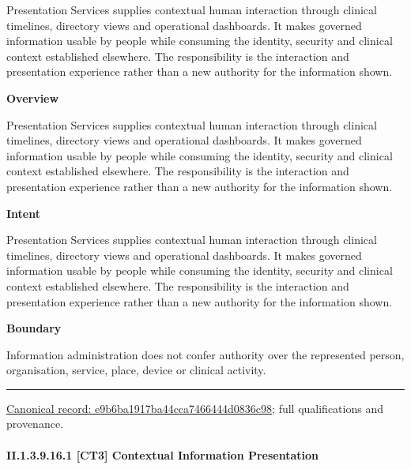 Presentation Services supplies contextual human interaction through clinical timelines, directory views and operational dashboards. It makes governed information usable by people while consuming the identity, security and clinical context established elsewhere. The responsibility is the interaction and presentation experience rather than a new authority for the information shown.



\textbf{Overview}



Presentation Services supplies contextual human interaction through clinical timelines, directory views and operational dashboards. It makes governed information usable by people while consuming the identity, security and clinical context established elsewhere. The responsibility is the interaction and presentation experience rather than a new authority for the information shown.



\textbf{Intent}



Presentation Services supplies contextual human interaction through clinical timelines, directory views and operational dashboards. It makes governed information usable by people while consuming the identity, security and clinical context established elsewhere. The responsibility is the interaction and presentation experience rather than a new authority for the information shown.



\textbf{Boundary}



Information administration does not confer authority over the represented person, organisation, service, place, device or clinical activity.



\medskip\hrule\medskip

{\footnotesize \href{../../../../../../../continuum/strategy/capability/e9b6ba1917ba44cca7466444d0836c98.md}{Canonical record: e9b6ba1917ba44cca7466444d0836c98}; full qualifications and provenance.}\par
\paragraph*{II.1.3.9.16.1 [CT3] Contextual Information Presentation}
\label{navigation:II.1.3.9.16.1}

